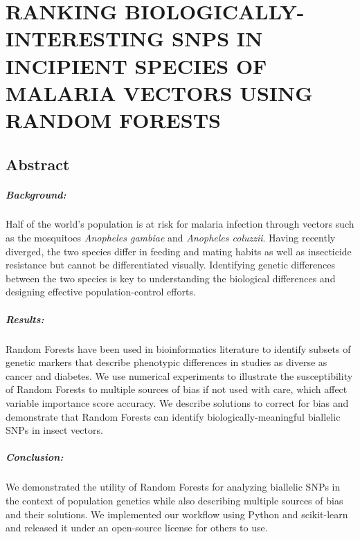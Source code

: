 \chapter{\uppercase{Ranking Biologically-Interesting SNPs in Incipient Species of Malaria Vectors using Random Forests}}

\section{Abstract}
  \paragraph*{Background:}
  Half of the world's population is at risk for malaria infection through vectors such as the mosquitoes \emph{Anopheles gambiae} and \emph{Anopheles coluzzii}.  Having recently diverged, the two species differ in feeding and mating habits as well as insecticide resistance but cannot be differentiated visually. Identifying genetic differences between the two species is key to understanding the biological differences and designing effective population-control efforts.
  
  \paragraph*{Results:}
  Random Forests have been used in bioinformatics literature to identify subsets of genetic markers that describe phenotypic differences in studies as diverse as cancer and diabetes. 
  We use numerical experiments to illustrate the susceptibility of Random Forests to multiple sources of bias if not used with care, which affect variable importance score accuracy.
  We describe solutions to correct for bias and demonstrate that Random Forests can identify biologically-meaningful biallelic SNPs in insect vectors.
  
  \paragraph*{Conclusion:}
  We demonstrated the utility of Random Forests for analyzing biallelic SNPs in the context of population genetics while also describing multiple sources of bias and their solutions.  We implemented our workflow using Python and scikit-learn and released it under an open-source license for others to use.

